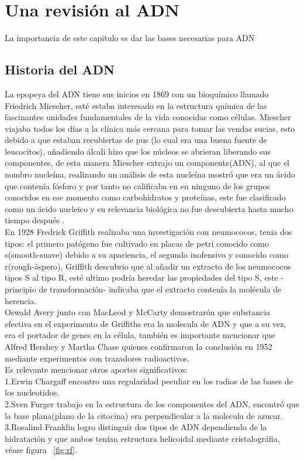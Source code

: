 
\clearpage

\section{Una revisión al ADN}
\label{sec:Intro}
La importancia de este capitulo es dar las bases necesarias para ADN


\subsection{Historia del ADN}
La epopeya del ADN tiene sus inicios en 1869 con un bioquímico llamado Friedrich Miescher, esté estaba interesado en la estructura química de las fascinantes unidades fundamentales de la vida conocidas como células.
Miescher viajaba todos los días a la clínica más cercana para tomar las vendas sucias, esto debido a que estaban recubiertas de pus (lo cual era una buena fuente de leucocitos), añadiendo álcali hizo que los núcleos se abrieran liberando sus componentes, de esta manera Miescher extrajo un componente(ADN), al que el nombro nucleína, realizando un análisis de esta nucleína mostró que era un ácido que contenía fósforo y por tanto no calificaba en en ninguno de los grupos conocidos en ese momento como carbohidratos y proteínas, este fue clasificado como un ácido nucleico y su relevancia biológica no fue descubierta hasta mucho tiempo después \cite{Susan}.\\

En 1928 Fredrick Griffith realizaba una investigación con neumococos, tenia dos tipos: el primero patógeno  fue cultivado en placas de petri conocido como s(smooth-suave) debido a su apariencia, el segundo inofensivo y conocido como r(rough-áspero), Griffith descubrio que al añadir un extracto de los neumococos tipos S al tipo R, esté ultimo podría heredar las propiedades del tipo S, este -principio de transformación- indicaba que el extracto contenía la molécula de herencia.\\

Oswald Avery junto con MacLeod y McCarty demostrarón que substancia efectiva en el experimento de Griffiths era la molecula de ADN y que a su vez, era el portador de genes en la célula, también es importante mencionar que Alfred Hershey y Martha Chase quienes confirmaron la conclusión en 1952 mediante experimentos con trazadores radioactivos\cite{Thormod}.\\

Es relevante mencionar otros aportes significativos: \\
1.Erwin Chargaff encontro una regularidad peculiar en los radios de las bases de los nucleotidos.\\
2.Sven Furger trabajo en la estructura de los componentes del ADN, encontró que la base plana(plano de la citocina) era perpendicular a la molecula de azucar.\\
3.Rosalind Franklin logro distinguir dos tipos de ADN dependiendo de la hidratación y que ambos tenían estructura helicoidal mediante cristalográfia, véase figura ~\ref{fig:rf}.

